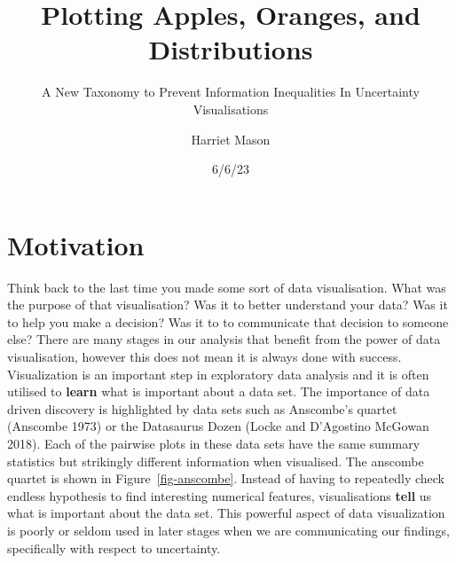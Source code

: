 \documentclass[
  letterpaper,
  DIV=11,
  numbers=noendperiod]{scrartcl}
\title{Plotting Apples, Oranges, and Distributions}
\subtitle{A New Taxonomy to Prevent Information Inequalities In
Uncertainty Visualisations}
\author{Harriet Mason}
\date{6/6/23}
\begin{document}
\maketitle
\ifdefined\Shaded\renewenvironment{Shaded}{\begin{tcolorbox}[boxrule=0pt, frame hidden, interior hidden, breakable, borderline west={3pt}{0pt}{shadecolor}, sharp corners, enhanced]}{\end{tcolorbox}}\fi

\hypertarget{motivation}{%
\section{Motivation}\label{motivation}}

Think back to the last time you made some sort of data visualisation.
What was the purpose of that visualisation? Was it to better understand
your data? Was it to help you make a decision? Was it to to communicate
that decision to someone else? There are many stages in our analysis
that benefit from the power of data visualisation, however this does not
mean it is always done with success. Visualization is an important step
in exploratory data analysis and it is often utilised to \textbf{learn}
what is important about a data set. The importance of data driven
discovery is highlighted by data sets such as Anscombe's quartet
(Anscombe 1973) or the Datasaurus Dozen (Locke and D'Agostino McGowan
2018). Each of the pairwise plots in these data sets have the same
summary statistics but strikingly different information when visualised.
The anscombe quartet is shown in Figure~\ref{fig-anscombe}. Instead of
having to repeatedly check endless hypothesis to find interesting
numerical features, visualisations \textbf{tell} us what is important
about the data set. This powerful aspect of data visualization is poorly
or seldom used in later stages when we are communicating our findings,
specifically with respect to uncertainty.
\end{document}
